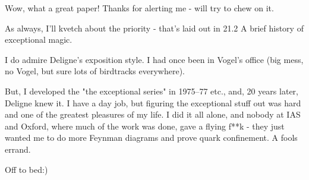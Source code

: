 \begin{description}
Wow, what a great paper! Thanks for alerting me - will try to chew on it.

As always, I'll kvetch about the priority - that's laid out in
{21.2 A brief history of exceptional magic}.

I do admire Deligne's exposition style. I had once been in Vogel's office
(big mess, no Vogel, but sure lots of birdtracks everywhere).

But, I developed the "the exceptional series" in 1975–77 etc., and, 20
years later,  Deligne
 {knew it}.
I have a day job, but figuring the exceptional stuff out was hard and
one of the greatest pleasures of my life. I did it all alone, and nobody
at IAS and Oxford, where much of the work was done, gave a flying f**k -
they just wanted me to do more Feynman diagrams and prove quark
confinement. A fools errand.

Off to bed:)







\end{description}
\renewcommand{\ssp}{a}


\printbibliography[heading=subbibintoc,title={References}]
